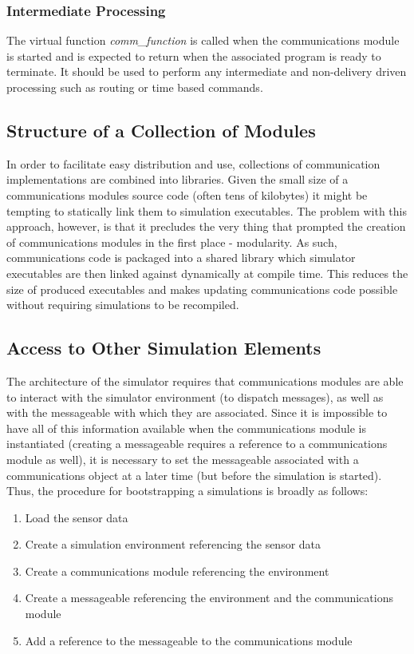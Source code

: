 \subsubsection{Intermediate Processing}
The virtual function \textit{comm\_function} is called when the communications module is started and is expected to return when the associated program is ready to terminate. It should be used to perform any intermediate and non-delivery driven processing such as routing or time based commands.
		
\subsection{Structure of a Collection of Modules}
	
In order to facilitate easy distribution and use, collections of communication implementations are combined into libraries. Given the small size of a communications modules source code (often tens of kilobytes) it might be tempting to statically link them to simulation executables. The problem with this approach, however, is that it precludes the very thing that prompted the creation of communications modules in the first place - modularity. As such, communications code is packaged into a shared library which simulator executables are then linked against dynamically at compile time. This reduces the size of produced executables and makes updating communications code possible without requiring simulations to be recompiled.

\subsection{Access to Other Simulation Elements}
		
The architecture of the simulator requires that communications modules are able to interact with the simulator environment (to dispatch messages), as well as with the messageable with which they are associated. Since it is impossible to have all of this information available when the communications module is instantiated (creating a messageable requires a reference to a communications module as well), it is necessary to set the messageable associated with a communications object at a later time (but before the simulation is started). Thus, the procedure for bootstrapping a simulations is broadly as follows:

\begin{enumerate}
	\item Load the sensor data
	\item Create a simulation environment referencing the sensor data
	\item Create a communications module referencing the environment
	\item Create a messageable referencing the environment and the communications module
	\item Add a reference to the messageable to the communications module
\end{enumerate}

